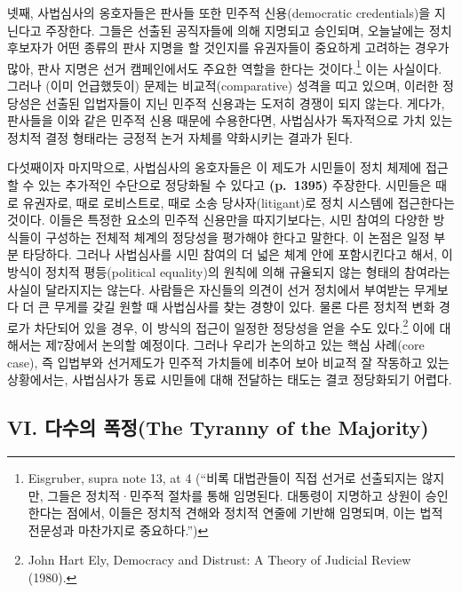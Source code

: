\documentclass[a4paper,12pt,oneside]{article}  %
\begin{document}
넷째, 사법심사의 옹호자들은 판사들 또한 민주적 신용(democratic
credentials)을 지닌다고 주장한다. 그들은 선출된 공직자들에 의해 지명되고
승인되며, 오늘날에는 정치 후보자가 어떤 종류의 판사 지명을 할 것인지를
유권자들이 중요하게 고려하는 경우가 많아, 판사 지명은 선거 캠페인에서도
주요한 역할을 한다는 것이다.\footnote{Eisgruber, supra note 13, at 4
  (``비록 대법관들이 직접 선거로 선출되지는 않지만, 그들은 정치적·민주적
  절차를 통해 임명된다. 대통령이 지명하고 상원이 승인한다는 점에서,
  이들은 정치적 견해와 정치적 연줄에 기반해 임명되며, 이는 법적 전문성과
  마찬가지로 중요하다.'')} 이는 사실이다. 그러나 (이미 언급했듯이)
문제는 비교적(comparative) 성격을 띠고 있으며, 이러한 정당성은 선출된
입법자들이 지닌 민주적 신용과는 도저히 경쟁이 되지 않는다. 게다가,
판사들을 이와 같은 민주적 신용 때문에 수용한다면, 사법심사가 독자적으로
가치 있는 정치적 결정 형태라는 긍정적 논거 자체를 약화시키는 결과가
된다.

다섯째이자 마지막으로, 사법심사의 옹호자들은 이 제도가 시민들이 정치
체제에 접근할 수 있는 추가적인 수단으로 정당화될 수 있다고
\textbf{(p.~1395)} 주장한다. 시민들은 때로 유권자로, 때로 로비스트로,
때로 소송 당사자(litigant)로 정치 시스템에 접근한다는 것이다. 이들은
특정한 요소의 민주적 신용만을 따지기보다는, 시민 참여의 다양한 방식들이
구성하는 전체적 체계의 정당성을 평가해야 한다고 말한다. 이 논점은 일정
부분 타당하다. 그러나 사법심사를 시민 참여의 더 넓은 체계 안에
포함시킨다고 해서, 이 방식이 정치적 평등(political equality)의 원칙에
의해 규율되지 않는 형태의 참여라는 사실이 달라지지는 않는다. 사람들은
자신들의 의견이 선거 정치에서 부여받는 무게보다 더 큰 무게를 갖길 원할
때 사법심사를 찾는 경향이 있다. 물론 다른 정치적 변화 경로가 차단되어
있을 경우, 이 방식의 접근이 일정한 정당성을 얻을 수도 있다.\footnote{John
  Hart Ely, Democracy and Distrust: A Theory of Judicial Review (1980).}
이에 대해서는 제7장에서 논의할 예정이다. 그러나 우리가 논의하고 있는
핵심 사례(core case), 즉 입법부와 선거제도가 민주적 가치들에 비추어 보아
비교적 잘 작동하고 있는 상황에서는, 사법심사가 동료 시민들에 대해
전달하는 태도는 결코 정당화되기 어렵다.

\subsection{VI. 다수의 폭정(The Tyranny of the
Majority)}\label{vi.-uxb2e4uxc218uxc758-uxd3eduxc815the-tyranny-of-the-majority}
\end{document}
